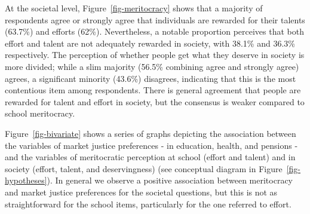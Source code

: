 \documentclass[
  12pt,
  letterpaper,
]{article}
\begin{document}
At the societal level, Figure~\ref{fig-meritocracy} shows that a
majority of respondents agree or strongly agree that individuals are
rewarded for their talents (63.7\%) and efforts (62\%). Nevertheless, a
notable proportion perceives that both effort and talent are not
adequately rewarded in society, with 38.1\% and 36.3\% respectively. The
perception of whether people get what they deserve in society is more
divided; while a slim majority (56.5\% combining agree and strongly
agree) agrees, a significant minority (43.6\%) disagrees, indicating
that this is the most contentious item among respondents. There is
general agreement that people are rewarded for talent and effort in
society, but the consensus is weaker compared to school meritocracy.

Figure~\ref{fig-bivariate} shows a series of graphs depicting the
association between the variables of market justice preferences - in
education, health, and pensions - and the variables of meritocratic
perception at school (effort and talent) and in society (effort, talent,
and deservingness) (see conceptual diagram in
Figure~\ref{fig-hypotheses}). In general we observe a positive
association between meritocracy and market justice preferences for the
societal questions, but this is not as straightforward for the school
items, particularly for the one referred to effort.
\end{document}
